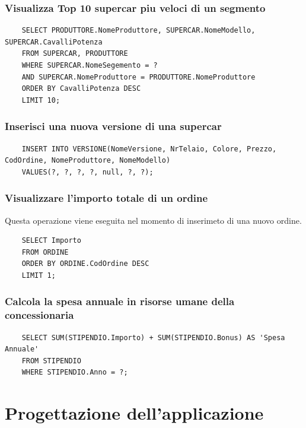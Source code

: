 \documentclass[11pt]{article}
\begin{document}
\subsubsection*{Visualizza Top 10 supercar piu veloci di un segmento}

\begin{lstlisting}
    SELECT PRODUTTORE.NomeProduttore, SUPERCAR.NomeModello, SUPERCAR.CavalliPotenza
    FROM SUPERCAR, PRODUTTORE
    WHERE SUPERCAR.NomeSegemento = ?
    AND SUPERCAR.NomeProduttore = PRODUTTORE.NomeProduttore
    ORDER BY CavalliPotenza DESC
    LIMIT 10;
\end{lstlisting}

\subsubsection*{Inserisci una nuova versione di una supercar}

\begin{lstlisting}
    INSERT INTO VERSIONE(NomeVersione, NrTelaio, Colore, Prezzo, CodOrdine, NomeProduttore, NomeModello)
    VALUES(?, ?, ?, ?, null, ?, ?);
\end{lstlisting}

\subsubsection*{Visualizzare l’importo totale di un ordine}

Questa operazione viene eseguita nel momento di inserimeto di una nuovo ordine.

\begin{lstlisting}
    SELECT Importo
    FROM ORDINE
    ORDER BY ORDINE.CodOrdine DESC
    LIMIT 1;
\end{lstlisting}

\subsubsection*{Calcola la spesa annuale in risorse umane della concessionaria}

\begin{lstlisting}
    SELECT SUM(STIPENDIO.Importo) + SUM(STIPENDIO.Bonus) AS 'Spesa Annuale'
    FROM STIPENDIO
    WHERE STIPENDIO.Anno = ?;
\end{lstlisting}

\section{Progettazione dell'applicazione}
\end{document}
